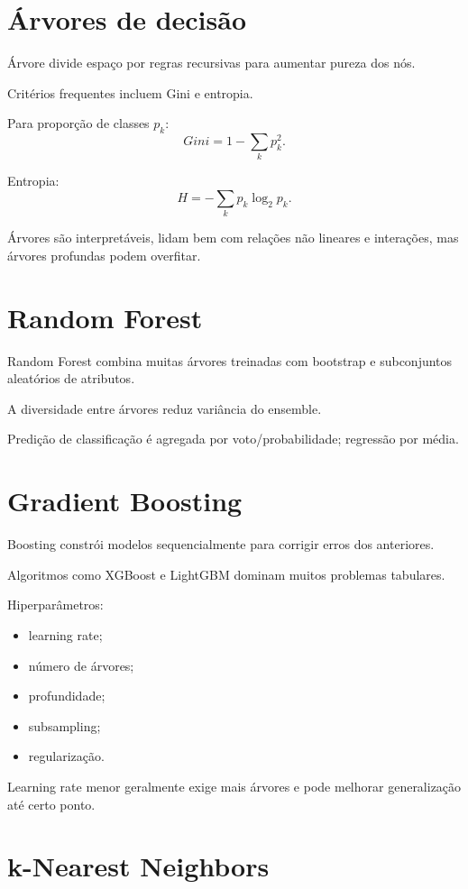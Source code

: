 \section{Árvores de decisão}

Árvore divide espaço por regras recursivas para aumentar pureza dos nós.

Critérios frequentes incluem Gini e entropia.

Para proporção de classes $p_k$:
\[
Gini=1-\sum_kp_k^2.
\]

Entropia:
\[
H=-\sum_kp_k\log_2p_k.
\]

Árvores são interpretáveis, lidam bem com relações não lineares e interações, mas árvores profundas podem overfitar.

\section{Random Forest}

Random Forest combina muitas árvores treinadas com bootstrap e subconjuntos aleatórios de atributos.

A diversidade entre árvores reduz variância do ensemble.

Predição de classificação é agregada por voto/probabilidade; regressão por média.

\section{Gradient Boosting}

Boosting constrói modelos sequencialmente para corrigir erros dos anteriores.

Algoritmos como XGBoost e LightGBM dominam muitos problemas tabulares.

Hiperparâmetros:
\begin{itemize}
\item learning rate;
\item número de árvores;
\item profundidade;
\item subsampling;
\item regularização.
\end{itemize}

Learning rate menor geralmente exige mais árvores e pode melhorar generalização até certo ponto.

\section{k-Nearest Neighbors}

